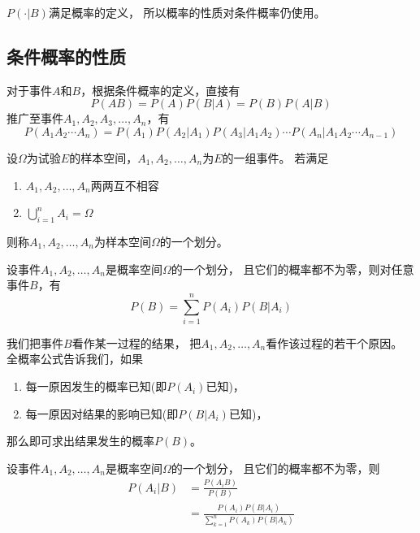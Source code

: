 \begin{remark}
  $P(\cdot|B)$满足概率的定义，
  所以概率的性质对条件概率仍使用。
\end{remark}

\subsection{条件概率的性质}
\begin{theorem}[乘法公式]
  对于事件$A$和$B$，根据条件概率的定义，直接有
  \begin{displaymath}
    P(AB) = P(A)P(B|A) = P(B)P(A|B)
  \end{displaymath}
  推广至事件$A_1,A_2,A_3,\dots,A_n$，有
  \begin{displaymath}
    P(A_1A_2\cdots A_n) = P(A_1)P(A_2|A_1)P(A_3|A_1A_2)
    \cdots P(A_n|A_1A_2\cdots A_{n-1})
  \end{displaymath}
\end{theorem}

\begin{definition}[样本空间的划分]
  设$\Omega$为试验$E$的样本空间，$A_1,A_2,\dots,A_n$为$E$的一组事件。
  若满足
  \begin{enumerate}
    \item 
    $A_1,A_2,\dots,A_n$两两互不相容
    \item 
    $\bigcup_{i=1}^n A_i = \Omega$
  \end{enumerate}
  则称$A_1,A_2,\dots,A_n$为样本空间$\Omega$的一个划分。
\end{definition}

\begin{theorem}[全概率公式]
  设事件$A_1,A_2,\dots,A_n$是概率空间$\Omega$的一个划分，
  且它们的概率都不为零，则对任意事件$B$，有
  \begin{displaymath}
    P(B) = \sum_{i=1}^nP(A_i)P(B|A_i)
  \end{displaymath}
\end{theorem}

\begin{remark}
  我们把事件$B$看作某一过程的结果，
  把$A_1,A_2,\dots,A_n$看作该过程的若干个原因。
  全概率公式告诉我们，如果
  \begin{enumerate}
    \item
    每一原因发生的概率已知(即$P(A_i)$已知)， 
    \item
    每一原因对结果的影响已知(即$P(B|A_i)$已知)， 
  \end{enumerate}
  那么即可求出结果发生的概率$P(B)$。
\end{remark}
\begin{theorem}[贝叶斯公式]
  设事件$A_1,A_2,\dots,A_n$是概率空间$\Omega$的一个划分，
  且它们的概率都不为零，则
  \begin{align*}
    P(A_i|B) &= \frac{P(A_iB)}{P(B)} \\
    &= \frac{P(A_i)P(B|A_i)}{\sum_{k=1}^n P(A_k)P(B|A_k)}
  \end{align*}
\end{theorem}

